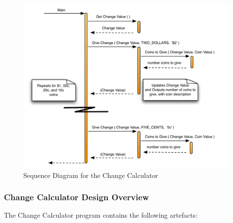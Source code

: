 \begin{figure}[htbp]
   \centering
   \includegraphics[width=\textwidth]{./topics/storing-using-data/images/SimpleCalcSeq} 
   \caption{Sequence Diagram for the Change Calculator}
   \label{fig:simple-change-seq}
\end{figure}

\clearpage

\subsubsection{Change Calculator Design Overview} %
\label{ssub:change_calculator_design_overview}

The Change Calculator program contains the following artefacts:


